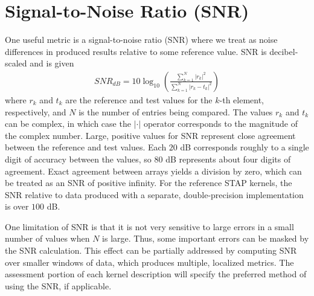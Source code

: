 \documentclass{report}
\begin{document}

\section{Signal-to-Noise Ratio (SNR)}
\label{sec:correctness:snr}

One useful metric is a signal-to-noise ratio (SNR) where we treat as noise
differences in produced results relative to some reference value.
SNR is decibel-scaled and is given
\begin{align}
    SNR_{dB} = 10 \log_{10} \left( \frac{\sum_{k=1}^{N} |r_k|^2}{\sum_{k=1}^{N} |r_k - t_k|^2} \right)
\end{align}
where $r_k$ and $t_k$ are the reference and test values for the
$k$-th element, respectively, and $N$ is the number of entries being compared.
The values $r_k$ and $t_k$ can be complex, in which case the $|\cdot|$ operator
corresponds to the magnitude of the complex number.
Large, positive values for SNR represent close agreement between the
reference and test values.
Each $20$ dB corresponds roughly to a single digit of accuracy between the
values, so $80$ dB represents about four digits of agreement.
Exact agreement between arrays yields a division by zero, which can be
treated as an SNR of positive infinity.
For the reference STAP kernels, the SNR relative to data produced
with a separate, double-precision implementation is over $100$ dB.

One limitation of SNR is that it is not very sensitive to large errors in a
small number of values when $N$ is large.
Thus, some important errors can be masked by the SNR calculation.
This effect can be partially addressed by computing SNR over smaller
windows of data, which produces multiple, localized metrics.
The assessment portion of each kernel description will specify
the preferred method of using the SNR, if applicable.





\end{document}

